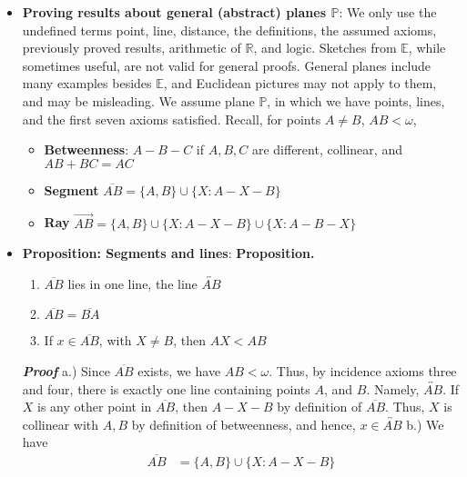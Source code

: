 \documentclass{report}
\begin{document}
\begin{itemize}
        \item \textbf{Proving results about general (abstract) planes $\mathbb{P}$}: We only use the undefined terms point, line, distance, the definitions, the assumed axioms, previously proved results, arithmetic of $\mathbb{R}$, and logic.
            \bigbreak \noindent 
            Sketches from $\mathbb{E}$, while sometimes useful, are not valid for general proofs. General planes include many examples besides $\mathbb{E}$, and Euclidean pictures may not apply to them, and may be misleading.
            \bigbreak \noindent 
            We assume plane $\mathbb{P}$, in which we have points, lines, and the first seven axioms satisfied.
            \bigbreak \noindent 
            Recall, for points $A\ne B$, $AB < \omega$,
            \begin{itemize}
                \item \textbf{Betweenness}: $A-B-C$ if $A,B,C$ are different, collinear, and $AB + BC = AC $
                \item \textbf{Segment} $\overline{AB} = \{A,B\} \cup \{X: A-X-B\}$
                \item \textbf{Ray} $\overrightarrow{AB} = \{A,B\} \cup \{X: A-X-B\} \cup \{X: A-B-X\}  $
            \end{itemize}
        \item \textbf{Proposition: Segments and lines}:
            \bigbreak \noindent 
            \textbf{Proposition.}
            \begin{enumerate}[label=(\alph*)]
                \item $\overline{AB}$ lies in one line, the line $\overleftrightarrow{AB} $
                \item $\overline{AB} = \overline{BA} $
                \item If $x\in \overline{AB}$, with $X \ne B$, then $AX < AB $
            \end{enumerate}
            \bigbreak \noindent 
            \textbf{\textit{Proof}} a.) Since $\overline{AB}$ exists, we have $AB < \omega$. Thus, by incidence axioms three and four, there is exactly one line containing points $A$, and $B$. Namely, $\overleftrightarrow{AB} $. If $X$ is any other point in $\overline{AB}$, then $A-X-B$ by definition of $\overline{AB}$. Thus, $X$ is collinear with $A,B$ by definition of betweenness, and hence, $x \in \overleftrightarrow{AB}$
            \bigbreak \noindent 
            b.) We have
            \begin{align*}
                \overline{AB} &= \{A,B\} \cup \{X: A-X-B\} \tag{1}\\

\end{align*}
\end{itemize}
\end{document}
